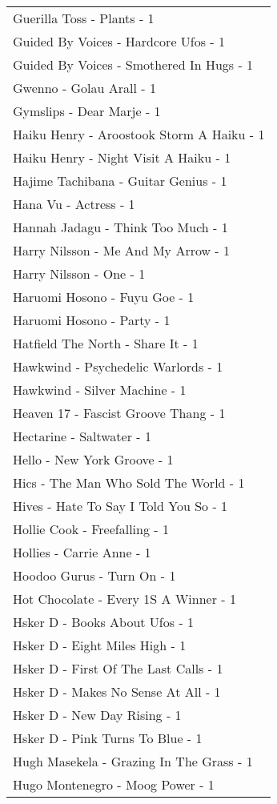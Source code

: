 \documentclass[
]{article}
\begin{document}
\begin{longtable}{l}
Guerilla Toss - Plants - 1 \\ 
Guided By Voices - Hardcore Ufos - 1 \\ 
Guided By Voices - Smothered In Hugs - 1 \\ 
Gwenno - Golau Arall - 1 \\ 
Gymslips - Dear Marje - 1 \\ 
Haiku Henry - Aroostook Storm A Haiku - 1 \\ 
Haiku Henry - Night Visit A Haiku - 1 \\ 
Hajime Tachibana - Guitar Genius - 1 \\ 
Hana Vu - Actress - 1 \\ 
Hannah Jadagu - Think Too Much - 1 \\ 
Harry Nilsson - Me And My Arrow - 1 \\ 
Harry Nilsson - One - 1 \\ 
Haruomi Hosono - Fuyu Goe - 1 \\ 
Haruomi Hosono - Party - 1 \\ 
Hatfield The North - Share It - 1 \\ 
Hawkwind - Psychedelic Warlords - 1 \\ 
Hawkwind - Silver Machine - 1 \\ 
Heaven 17 - Fascist Groove Thang - 1 \\ 
Hectarine - Saltwater - 1 \\ 
Hello - New York Groove - 1 \\ 
Hics - The Man Who Sold The World - 1 \\ 
Hives - Hate To Say I Told You So - 1 \\ 
Hollie Cook - Freefalling - 1 \\ 
Hollies - Carrie Anne - 1 \\ 
Hoodoo Gurus - Turn On - 1 \\ 
Hot Chocolate - Every 1S A Winner - 1 \\ 
Hsker D - Books About Ufos - 1 \\ 
Hsker D - Eight Miles High - 1 \\ 
Hsker D - First Of The Last Calls - 1 \\ 
Hsker D - Makes No Sense At All - 1 \\ 
Hsker D - New Day Rising - 1 \\ 
Hsker D - Pink Turns To Blue - 1 \\ 
Hugh Masekela - Grazing In The Grass - 1 \\ 
Hugo Montenegro - Moog Power - 1 \\ 

\end{longtable}
\end{document}
